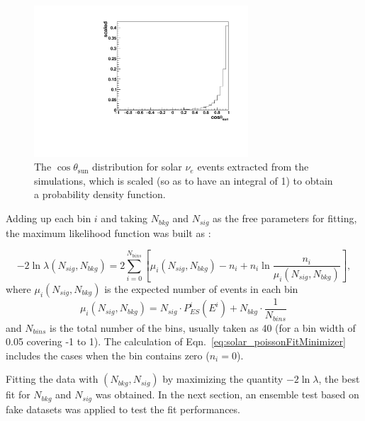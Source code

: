 \begin{figure}[!htb]
	\centering
	\includegraphics[width=8cm]{solarPDF.pdf}
	\caption[The $\cos\theta_\mathrm{sun}$ distribution of solar $\nu_e$ used as a PDF function.]{The $\cos\theta_\mathrm{sun}$ distribution for solar $\nu_e$ events extracted from the simulations, which is scaled (so as to have an integral of 1) to obtain a probability density function.\label{solarPDF}}
\end{figure}

Adding up each bin $i$ and taking $N_{bkg}$ and $N_{sig}$ as the free parameters for fitting, the maximum likelihood function was built as \cite{pdg2020}:

\begin{equation}\label{eq:solar_poissonFitMinimizer}
-2\ln\mathcal \lambda(N_{sig},N_{bkg})
=2\sum_{i=0}^{N_{bins}}[\mu_i(N_{sig},N_{bkg})-n_i+n_i\ln\frac{n_i}{\mu_i(N_{sig},N_{bkg})}],
\end{equation}
where $\mu_i(N_{sig},N_{bkg})$ is the expected number of events in each bin
\begin{equation*}
\mu_i(N_{sig},N_{bkg})=N_{sig}\cdot P^i_{ES}(E^i)+N_{bkg}\cdot\frac{1}{N_{bins}}\,
\end{equation*}
and $N_{bins}$ is the total number of the bins, usually taken as 40 (for a bin width of 0.05 covering -1 to 1). The calculation of Eqn.~\ref{eq:solar_poissonFitMinimizer} includes the cases when the bin contains zero ($n_i=0$).

Fitting the data with $(N_{bkg},N_{sig})$ by maximizing the quantity $-2\ln\mathcal\lambda$, the best fit for $N_{bkg}$ and $N_{sig}$ was obtained. In the next section, an ensemble test based on fake datasets was applied to test the fit performances.
%
%
